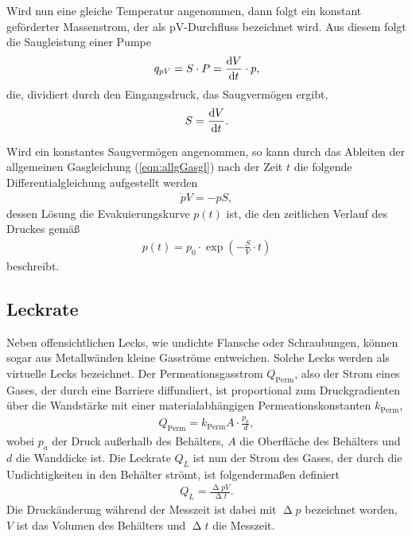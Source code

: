 \noindent
Wird nun eine gleiche Temperatur angenommen, dann folgt ein konstant geförderter Massenstrom, der als pV-Durchfluss bezeichnet wird. Aus diesem folgt die Saugleistung einer Pumpe
\begin{align}
    q_{pV} = S\cdot P=\frac{\text dV}{\text dt}\cdot p,
\end{align}
die, dividiert durch den Eingangsdruck, das Saugvermögen ergibt,
\begin{align}
    S=\frac{\text dV}{\text dt}.
\end{align}

\noindent
Wird ein konstantes Saugvermögen angenommen, so kann durch das Ableiten der allgemeinen Gasgleichung (\ref{eqn:allgGasgl}) nach der Zeit $t$ die folgende Differentialgleichung aufgestellt werden
\begin{align}
    \dot pV=-pS,
\end{align}
dessen Lösung die Evakuierungskurve $p(t)$ ist, die den zeitlichen Verlauf des Druckes gemäß
\begin{align}
    p(t)=p_0\cdot\exp\left(-\frac{S}{V}\cdot t\right)
\end{align}
beschreibt.

\subsection{Leckrate}
\label{subsec:leckrate}

Neben offensichtlichen Lecks, wie undichte Flansche oder Schraubungen, können sogar aus Metallwänden kleine Gasströme entweichen. Solche Lecks werden als virtuelle Lecks bezeichnet.
Der Permeationsgasstrom $Q_{\text{Perm}}$, also der Strom eines Gases, der durch eine Barriere diffundiert, ist proportional zum Druckgradienten über die Wandstärke mit einer materialabhängigen Permeationskonstanten $k_{\text{Perm}}$,
\begin{align}
    \label{eqn:permeaStrom}
    Q_{\text{Perm}} = k_{\text{Perm}} A\cdot\frac{p_a}{d},
\end{align}
wobei $p_a$ der Druck außerhalb des Behälters, $A$ die Oberfläche des Behälters und $d$ die Wanddicke ist. Die Leckrate $Q_L$ ist nun der Strom des Gases, der durch die Undichtigkeiten in den Behälter strömt, ist folgendermaßen definiert
\begin{align}
    Q_L=\frac{\upDelta p V}{\upDelta t}.
\end{align}
Die Druckänderung während der Messzeit ist dabei mit $\upDelta p$ bezeichnet worden, $V$ ist das Volumen des Behälters und $\upDelta t$ die Messzeit.

